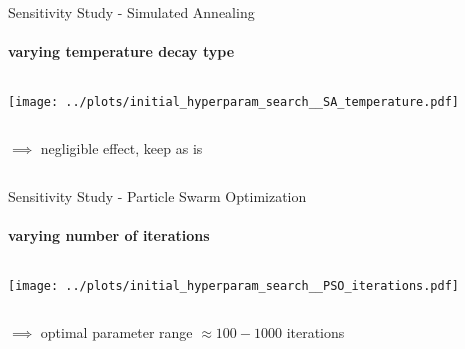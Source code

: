 \documentclass[11pt,aspectratio=169]{beamer}
\begin{document}
%
%

\begin{frame}{Sensitivity Study - Simulated Annealing}
    \framesubtitle{varying \textbf{temperature decay type}}

    \begin{columns}
    \begin{column}{0.8\textwidth}
        \texttt{[image: ../plots/initial\_hyperparam\_search\_\_SA\_temperature.pdf]}
    \end{column}
    \end{columns}

    \begin{columns}
        \begin{column}{0.8\textwidth}
            $\implies$ negligible effect, keep as is
        \end{column}
        \begin{column}{0.1\textwidth}
            \tiny{}
        \end{column}
    \end{columns}
\end{frame}

%
%

\begin{frame}{Sensitivity Study - Particle Swarm Optimization}
    \framesubtitle{varying \textbf{number of iterations}}

    \begin{columns}
    \begin{column}{0.8\textwidth}
        \texttt{[image: ../plots/initial\_hyperparam\_search\_\_PSO\_iterations.pdf]}
    \end{column}
    \end{columns}

    \begin{columns}
        \begin{column}{0.8\textwidth}
            $\implies$ optimal parameter range $\approx 100-1000$ iterations
        \end{column}
        \begin{column}{0.1\textwidth}
            \tiny{}
        \end{column}
    \end{columns}
\end{frame}

%
%
\end{document}
